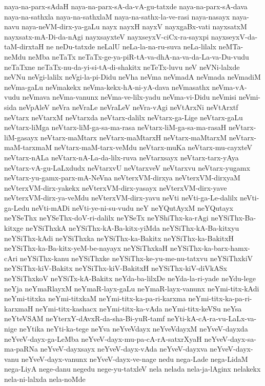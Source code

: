 {naya-na-parx-sAdaH
naya-na-parx-sA-da-vA-gu-tatxde
naya-na-parx-sA-dava
naya-na-sathxla
naya-na-sathxlaM
naya-na-sathx-la-ve-rasi
naya-nasayx
naya-navu
naya-neVM-dirx-ya-gaLu
nayx
nayxH
nayxV
nayxgaBx-vati
nayxsatxM
nayxsatx-mA-Di-da-nAgi
nayxsayxteV
nayxseyxV-ciCx-ra-sayxpi
nayxseyxV-da-taM-dirxtaH
ne
neDu-tatxde
neLalU
neLa-la-na-ru-suva
neLa-lilalx
neMTa-neMdu
neMba
neTaTx
neTaTx-ge-ya-piR-tA-va-dhA-na-va-da-La-va-Du-vudu
neTaTxne
neTaTx-nu-da-yi-si-tA-di-shakitx
neTeTx-luvu
neV
neVNi-lalxde
neVNu
neVgi-lalilx
neVgi-la-pi-Didu
neVha
neVma
neVmadA
neVmada
neVmadiM
neVma-gaLu
neVmakekx
neVma-kekx-hA-ni-yA-dava
neVmasathx
neVma-vA-vudu
neVmava
neVma-vanunx
neVma-ve-lilx-yadu
neVma-vi-Didu
neVmisi
neVmi-sida
neVpAleV
neVra
neVraLe
neVraLeV
neVra-vAgi
neVtArxNi
neVtArxtf
neVtarx
neVtarxM
neVtarxda
neVtarx-dalilx
neVtarx-ga-Lige
neVtarx-gaLu
neVtarx-liMga
neVtarx-liM-ga-sa-ma-rasa
neVtarx-liM-ga-sa-ma-rasaH
neVtarx-liM-gasayx
neVtarx-maMtarx
neVtarx-maMtarxH
neVtarx-maMtarxM
neVtarx-maM-tarxmaM
neVtarx-maM-tarx-veMdu
neVtarx-muKa
neVtarx-mu-cayxteV
neVtarx-nALa
neVtarx-nA-La-da-lilx-ruva
neVtarxsayx
neVtarx-tarx-yAya
neVtarx-vA-gu-LaLxdudx
neVtarxvU
neVtarxveV
neVtarxvu
neVtarx-yugamx
neVtarx-yu-gamx-parx-mA-NeVna
neVterxVM-dirxya
neVterxVM-dirxyaM
neVterxVM-dirx-yakekx
neVterxVM-dirx-yasayx
neVterxVM-dirx-yave
neVterxVM-dirx-ya-veMdu
neVterxVM-dirx-yavu
neVti
neVti-ga-Le-dalilx
neVti-ga-Ledu
neVti-mADi
neVti-ye-ni-su-vudu
neY
neYQutAyxM
neYQutayx
neYSeThx
neYSeThx-doV-ri-dalilx
neYSeTx
neYShiThx-ka-rAgi
neYSiThx-Ba-kitxge
neYSiThxkA
neYSiThx-kA-Ba-kitx-yiMda
neYSiThx-kA-Ba-kitxyu
neYSiThx-kAdi
neYSiThxka
neYSiThx-ka-Bakitx
neYSiThx-ka-BakitxH
neYSiThx-ka-Ba-kitx-yeM-be-nayayx
neYSiThxkaH
neYSiThx-ka-barx-hamx-cAri
neYSiThx-kanu
neYSiThxke
neYSiThx-ke-yu-me-nu-tatxvu
neYSiThxkiV
neYSiThx-kiV-Bakitx
neYSiThx-kiV-BakitxH
neYSiThx-kiV-diVkASx
neYSiThxkoV
neYSiTx-kA-Bakitx
neYda-ba-lilxDe
neYda-la-ri-yade
neYdu-lege
neYja
neYmaRlayxM
neYmaR-layx-gaLu
neYmaR-layx-vanunx
neYmi-titx-kAdi
neYmi-titxka
neYmi-titxkaM
neYmi-titx-ka-pa-ri-karxma
neYmi-titx-ka-pa-ri-karxmaH
neYmi-titx-kashacx
neYmi-titx-ka-vAda
neYmi-titx-keVSu
neYsa
neYteVSAM
neYterxY-dAvxR-da-sha-Bi-yuR-tamf
neYti-kA-cA-ra-vu-LaLx-va-nige
neYtika
neYti-ka-tege
neYva
neYveVdayx
neYveVdayxM
neYveV-dayxda
neYveV-dayx-ga-LeMba
neYveV-dayx-mu-pa-cA-rA-satxrXyaH
neYveV-dayx-sa-ma-paRNa
neYveV-dayxsayx
neYveV-dayx-vAda
neYveV-dayxva
neYveV-dayx-vanu
neYveV-dayx-vanunx
neYveV-dayx-ve-nage
nedu
nega-Lade
nega-LidaM
nega-LiyA
nege-danu
negedu
nege-yu-tatxleV
nela
nelada
nela-ja-lAginx
nelakekx
nela-ni-lalxda
nela-noMde
}
